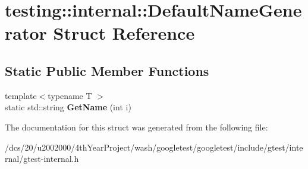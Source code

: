 \hypertarget{structtesting_1_1internal_1_1DefaultNameGenerator}{}\section{testing\+:\+:internal\+:\+:Default\+Name\+Generator Struct Reference}
\label{structtesting_1_1internal_1_1DefaultNameGenerator}
\subsection*{Static Public Member Functions}
\begin{DoxyCompactItemize}
\item 
\mbox{\label{structtesting_1_1internal_1_1DefaultNameGenerator_a28fd7ec53dfb647c9aed28d43f778910}} 
{\footnotesize template$<$typename T $>$ }\\static std\+::string {\bfseries Get\+Name} (int i)
\end{DoxyCompactItemize}


The documentation for this struct was generated from the following file\+:\begin{DoxyCompactItemize}
\item 
/dcs/20/u2002000/4th\+Year\+Project/wash/googletest/googletest/include/gtest/internal/gtest-\/internal.\+h\end{DoxyCompactItemize}
